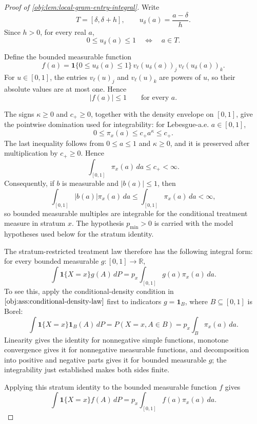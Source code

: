 \begin{proof}[Proof of \cref{obj:lem:local-gram-entry-integral}]
Write
\[
T=[\delta,\delta+h],
\qquad
u_\delta(a)=\frac{a-\delta}{h}.
\]
Since \(h>0\), for every real \(a\),
\[
0\le u_\delta(a)\le1
\quad\Longleftrightarrow\quad
a\in T .
\] %

Define the bounded measurable function
\[
f(a)
=
\mathbf 1\{0\le u_\delta(a)\le1\}\,
v_\ell(u_\delta(a))_j\,v_\ell(u_\delta(a))_k .
\]
For \(u\in[0,1]\), the entries \(v_\ell(u)_j\) and \(v_\ell(u)_k\) are powers of
\(u\), so their absolute values are at most one. Hence
\[
|f(a)|\le1
\qquad\text{for every }a .
\] %

The signs \(\kappa\ge0\) and \(c_+\ge0\), together with the density envelope on
\([0,1]\), give the pointwise domination used for integrability: for
Lebesgue-a.e. \(a\in[0,1]\),
\[
0\le \pi_x(a)\le c_+a^\kappa\le c_+ .
\]
The last inequality follows from \(0\le a\le1\) and \(\kappa\ge0\), and it is
preserved after multiplication by \(c_+\ge0\). Hence
\[
\int_{[0,1]}\pi_x(a)\,da\le c_+<\infty .
\]
Consequently, if \(b\) is measurable and \(|b(a)|\le1\), then
\[
\int_{[0,1]} |b(a)|\pi_x(a)\,da
\le
\int_{[0,1]}\pi_x(a)\,da
<\infty,
\]
so bounded measurable multiples are integrable for the conditional treatment
measure in stratum \(x\). The hypothesis \(p_{\min}>0\) is carried with the
model hypotheses used below for the stratum identity. %

The stratum-restricted treatment law therefore has the following integral form:
for every bounded measurable \(g:[0,1]\to\mathbb R\),
\[
\int \mathbf 1\{X=x\}g(A)\,dP
=
p_x\int_{[0,1]}g(a)\pi_x(a)\,da .
\]
To see this, apply the conditional-density condition in
\(\cref{obj:ass:conditional-density-law}\) first to indicators
\(g=\mathbf 1_B\), where \(B\subseteq[0,1]\) is Borel:
\[
\int \mathbf 1\{X=x\}\mathbf 1_B(A)\,dP
=
P(X=x,A\in B)
=
p_x\int_B\pi_x(a)\,da .
\]
Linearity gives the identity for nonnegative simple functions, monotone
convergence gives it for nonnegative measurable functions, and decomposition
into positive and negative parts gives it for bounded measurable \(g\); the
integrability just established makes both sides finite. %

Applying this stratum identity to the bounded measurable function \(f\) gives
\[
\int \mathbf 1\{X=x\}f(A)\,dP
=
p_x\int_{[0,1]}f(a)\pi_x(a)\,da .
\] %


\end{proof}
